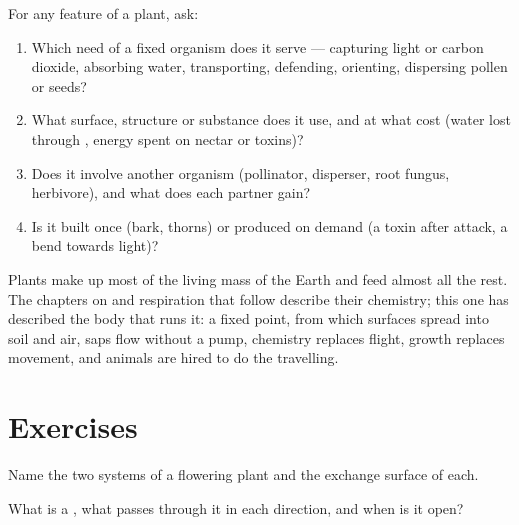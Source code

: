 \begin{method}\label{met:g12:plant-rooted-life:read}
For any feature of a plant, ask:
\begin{enumerate}
  \item Which need of a fixed organism does it serve --- capturing
        light or carbon dioxide, absorbing water, transporting,
        defending, orienting, dispersing pollen or seeds?
  \item What surface, structure or substance does it use, and at what
        cost (water lost through , energy spent on nectar or
        toxins)?
  \item Does it involve another organism (pollinator, disperser, root
        fungus, herbivore), and what does each partner gain?
  \item Is it built once (bark, thorns) or produced on demand (a
        toxin after attack, a bend towards light)?
\end{enumerate}
\end{method}

\begin{remark}\label{rem:g12:plant-rooted-life:half}
Plants make up most of the living mass of the Earth and feed almost
all the rest. The chapters on  and respiration that
follow describe their chemistry; this one has described the body
that runs it: a fixed point, from which surfaces spread into soil and
air, saps flow without a pump, chemistry replaces flight, growth
replaces movement, and animals are hired to do the travelling.
\end{remark}

\section{Exercises}

\begin{exercise}[$\star$]\label{exo:g12:plant-rooted-life:1}
Name the two systems of a flowering plant and the exchange surface of
each.
\end{exercise}

\begin{exercise}[$\star$]\label{exo:g12:plant-rooted-life:2}
What is a , what passes through it in each direction, and when
is it open?
\end{exercise}

